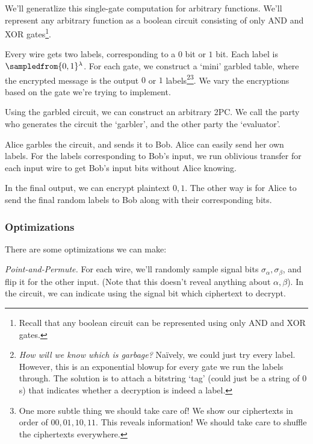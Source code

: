We'll generatlize this single-gate computation for arbitrary functions. We'll represent any arbitrary function as a boolean circuit consisting of only \textsf{AND} and \textsf{XOR} gates\footnote{Recall that any boolean circuit can be represented using only \textsf{AND} and \textsf{XOR} gates.}.


Every wire gets two labels, corresponding to a $0$ bit or $1$ bit. Each label is $\sampledfrom\{0,1\}^\lambda$. For each gate, we construct a `mini' garbled table, where the encrypted message is the output $0$ or $1$ labels\footnote{\emph{How will we know which is garbage?} Na\"ively, we could just try every label. However, this is an exponential blowup for every gate we run the labels through. The solution is to attach a bitstring `tag' (could just be a string of $0$s) that indicates whether a decryption is indeed a label.}\footnote{One more subtle thing we should take care of! We show our ciphertexts in order of $00,01,10,11$. This reveals information! We should take care to shuffle the ciphertexts everywhere.}. We vary the encryptions based on the gate we're trying to implement.

Using the garbled circuit, we can construct an arbitrary 2PC. We call the party who generates the circuit the `garbler', and the other party the `evaluator'.


Alice garbles the circuit, and sends it to Bob. Alice can easily send her own labels. For the labels corresponding to Bob's input, we run oblivious transfer for each input wire to get Bob's input bits without Alice knowing.

In the final output, we can encrypt plaintext $0, 1$. The other way is for Alice to send the final random labels to Bob along with their corresponding bits.

\subsubsection{Optimizations}
There are some optimizations we can make:

\emph{Point-and-Permute.} For each wire, we'll randomly sample signal bits $\sigma_\alpha, \sigma_\beta$, and flip it for the other input. (Note that this doesn't reveal anything about $\alpha,\beta$). In the circuit, we can indicate using the signal bit which ciphertext to decrypt.


